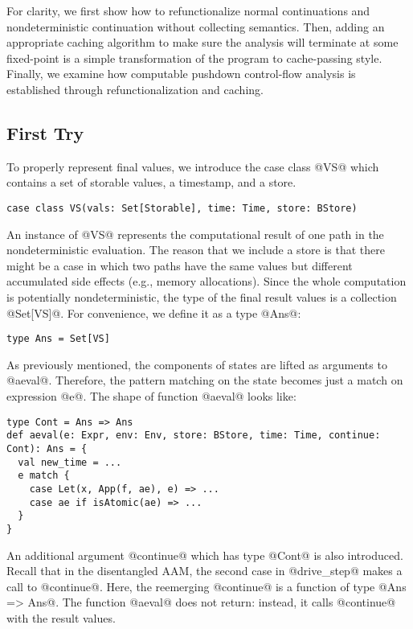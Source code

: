 \documentclass[acmsmall]{acmart}\settopmatter{}
\begin{document}
For clarity, we first show how to refunctionalize normal continuations and
nondeterministic continuation without collecting semantics.
Then, adding an appropriate caching algorithm to make sure the analysis will
terminate at some fixed-point is a simple transformation of the program to cache-passing
style. Finally, we examine how computable pushdown control-flow analysis is established
through refunctionalization and caching.

\subsection{First Try}

To properly represent final values, we introduce the case class @VS@ which
contains a set of storable values, a timestamp, and a store.

\begin{lstlisting}
case class VS(vals: Set[Storable], time: Time, store: BStore)
\end{lstlisting}

An instance of @VS@ represents the computational result of one path in
the nondeterministic evaluation.
The reason that we include a store is that there might be a case in which two paths
have the same values but different accumulated side effects (e.g., memory allocations).
Since the whole computation is potentially nondeterministic, the type of the final result
values is a collection @Set[VS]@. For convenience, we define it as a type @Ans@:

\begin{lstlisting}
type Ans = Set[VS]
\end{lstlisting}

As previously mentioned, the components of states are lifted as arguments to
@aeval@. Therefore, the pattern matching on the state becomes just a match on
expression @e@. The shape of function @aeval@ looks like:

\begin{lstlisting}
type Cont = Ans => Ans
def aeval(e: Expr, env: Env, store: BStore, time: Time, continue: Cont): Ans = {
  val new_time = ...
  e match {
    case Let(x, App(f, ae), e) => ...
    case ae if isAtomic(ae) => ...
  }
}
\end{lstlisting}

An additional argument @continue@ which has type @Cont@ is also introduced.
Recall that in the disentangled AAM, the second case in @drive_step@
makes a call to @continue@. Here, the reemerging @continue@ is a function
of type @Ans => Ans@. The function @aeval@ does not return: instead, it calls
@continue@ with the result values.
\end{document}
